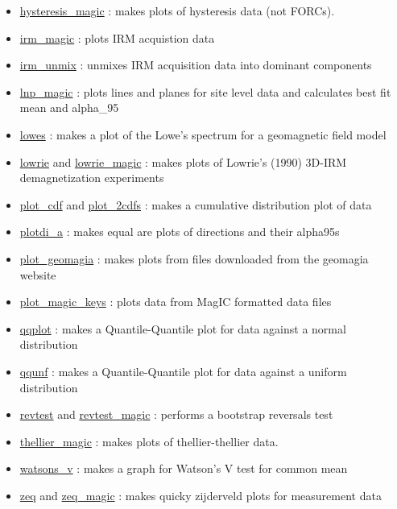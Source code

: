 \documentclass[11pt]{book}
\begin{document}
{{\begin{itemize}
\item \href{http://pmagpy.github.io/PmagPy.html#hysteresis_magic}{hysteresis\_magic} : makes plots of hysteresis data (not FORCs).
\item \href{http://pmagpy.github.io/PmagPy.html#irm_magic}{irm\_magic} : plots IRM acquistion data
\item \href{http://pmagpy.github.io/PmagPy.html#irm_unmix}{irm\_unmix} : unmixes IRM acquisition data into dominant components
\item \href{http://pmagpy.github.io/PmagPy.html#lnp_magic}{lnp\_magic} : plots lines and planes for site level data and calculates best fit mean and alpha\_95
\item \href{http://pmagpy.github.io/PmagPy.html#lowes}{lowes} : makes a plot of the Lowe's spectrum for a geomagnetic field model
\item \href{http://pmagpy.github.io/PmagPy.html#lowrie}{lowrie} and \href{http://pmagpy.github.io/PmagPy.html#lowrie_magic}{lowrie\_magic} : makes plots of Lowrie's (1990) 3D-IRM demagnetization experiments
\item \href{http://pmagpy.github.io/PmagPy.html#plot_cdf}{plot\_cdf} and \href{http://pmagpy.github.io/PmagPy.html#plot_2cdfs}{plot\_2cdfs} : makes a cumulative distribution plot of data
\item \href{http://pmagpy.github.io/PmagPy.html#plotdi_a}{plotdi\_a} : makes equal are plots of directions and their alpha95s
\item \href{http://pmagpy.github.io/PmagPy.html#plot_geomagia}{plot\_geomagia} : makes plots from files downloaded from the  geomagia website
\item \href{http://pmagpy.github.io/PmagPy.html#plot_magic_keys}{plot\_magic\_keys} : plots data from MagIC formatted data files
\item \href{http://pmagpy.github.io/PmagPy.html#qqplot}{qqplot} : makes a Quantile-Quantile plot for data against a normal distribution
\item \href{http://pmagpy.github.io/PmagPy.html#qqunf}{qqunf} : makes a Quantile-Quantile plot for data against a uniform distribution
\item \href{http://pmagpy.github.io/PmagPy.html#revtest}{revtest} and \href{http://pmagpy.github.io/PmagPy.html#revtest_magic}{revtest\_magic} : performs a bootstrap reversals test
\item \href{http://pmagpy.github.io/PmagPy.html#thellier_magic}{thellier\_magic} : makes plots of thellier-thellier data.
\item \href{http://pmagpy.github.io/PmagPy.html#watsons_v}{watsons\_v} : makes a graph for Watson's V test for common mean
\item \href{http://pmagpy.github.io/PmagPy.html#zeq}{zeq} and \href{http://pmagpy.github.io/PmagPy.html#zeq_magic}{zeq\_magic} : makes quicky zijderveld plots for measurement data


\end{itemize}}}
\end{document}
